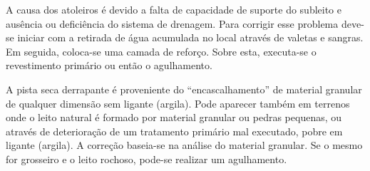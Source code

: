 
A causa dos atoleiros é devido a falta de capacidade de suporte do subleito e ausência ou deficiência do sistema de drenagem. Para corrigir esse problema deve-se iniciar com a retirada de água acumulada no local através de valetas e sangras. Em seguida, coloca-se uma camada de reforço. Sobre esta, executa-se o revestimento primário ou então o agulhamento.

A pista seca derrapante é proveniente do ``encascalhamento'' de material granular de qualquer dimensão sem ligante (argila). Pode aparecer também em terrenos onde o leito natural é formado por material granular ou pedras pequenas, ou através de deterioração de um tratamento primário mal executado, pobre em ligante (argila).
A correção baseia-se na análise do material granular. Se o mesmo for grosseiro e o leito rochoso, pode-se realizar um agulhamento.
